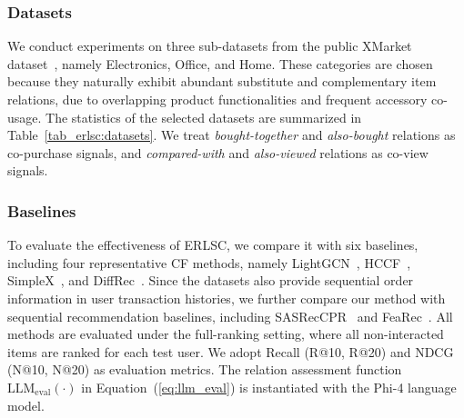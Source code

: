 \subsubsection{Datasets}
\begin{table}
  \caption{Statistics of datasets for ERLSC.}
  \label{tab_erlsc:datasets}
\end{table}
We conduct experiments on three sub-datasets from the public XMarket dataset~\cite{xmarket}, namely Electronics, Office, and Home. These categories are chosen because they naturally exhibit abundant substitute and complementary item relations, due to overlapping product functionalities and frequent accessory co-usage. The statistics of the selected datasets are summarized in Table~\ref{tab_erlsc:datasets}. We treat \textit{bought-together} and  \textit{also-bought} relations as co-purchase signals, and \textit{compared-with} and \textit{also-viewed} relations as co-view signals.

\subsubsection{Baselines}
To evaluate the effectiveness of ERLSC, we compare it with six baselines, including four representative CF methods, namely LightGCN~\cite{LightGCN}, HCCF~\cite{hccf}, SimpleX~\cite{simplex}, and DiffRec~\cite{diffrec}. 
Since the datasets also provide sequential order information in user transaction histories, we further compare our method with sequential recommendation baselines, including SASRecCPR~\cite{sascpr} and FeaRec~\cite{fearec}.
All methods are evaluated under the full-ranking setting, where all non-interacted items are ranked for each test user. We adopt Recall (R@10, R@20) and NDCG (N@10, N@20) as evaluation metrics. The relation assessment function $\text{LLM}_\text{eval}(\cdot)$ in Equation~(\ref{eq:llm_eval}) is instantiated with the Phi-4 language model.
 

